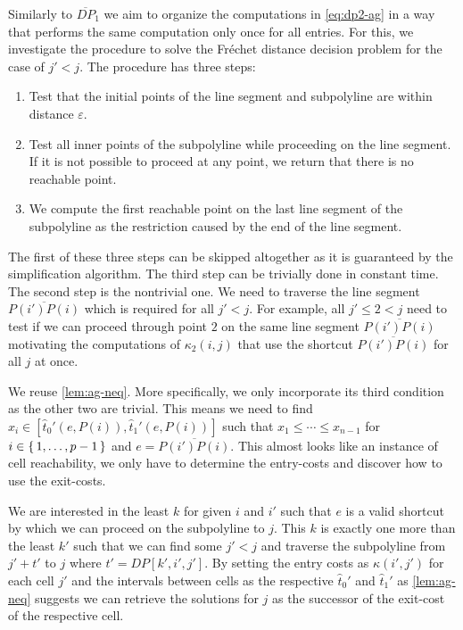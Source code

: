 	
Similarly to \(\overline{DP}_1\) we aim to organize the computations in \cref{eq:dp2-ag} in a way that performs the same computation only once for all entries. For this, we investigate the procedure to solve the Fréchet distance decision problem for the case of \(j' < j\). The procedure has three steps:
\begin{enumerate}
	\item Test that the initial points of the line segment and subpolyline are within distance \(\varepsilon\).
	\item Test all inner points of the subpolyline while proceeding on the line segment. If it is not possible to proceed at any point, we return that there is no reachable point.
	\item We compute the first reachable point on the last line segment of the subpolyline as the restriction caused by the end of the line segment. 
\end{enumerate}

The first of these three steps can be skipped altogether as it is guaranteed by the simplification algorithm. The third step can be trivially done in constant time. The second step is the nontrivial one. We need to traverse the line segment \(\overline{P(i')P(i)}\) which is required for all \(j' < j\). For example, all \(j' \leq 2 < j\) need to test if we can proceed through point \(2\) on the same line segment \(\overline{P(i')P(i)}\) motivating the computations of \(\kappa_2(i, j)\) that use the shortcut \(\overline{P(i')P(i)}\) for all \(j\) at once. 

We reuse \cref{lem:ag-neq}. More specifically, we only incorporate its third condition as the other two are trivial. This means we need to find \(x_i \in [\hat t_0'(e, P(i)), \hat t_1'(e, P(i))]\) such that \(x_1 \leq \cdots \leq x_{n-1}\) for \(i \in \set{1, \dots, p - 1}\) and \(e = \overline{P(i')P(i)}\). This almost looks like an instance of cell reachability, we only have to determine the entry-costs and discover how to use the exit-costs. 

We are interested in the least \(k\) for given \(i\) and \(i'\) such that \(e\) is a valid shortcut by which we can proceed on the subpolyline to \(j\). This \(k\) is exactly one more than the least \(k'\) such that we can find some \(j' < j\) and traverse the subpolyline from \(j' + t'\) to \(j\) where \(t' = DP[k', i', j']\). By setting the entry costs as \(\kappa(i',j')\) for each cell \(j'\) and the intervals between cells as the respective \(\hat t_0'\) and \(\hat t_1'\) as \cref{lem:ag-neq} suggests we can retrieve the solutions for \(j\) as the successor of the exit-cost of the respective cell. 

